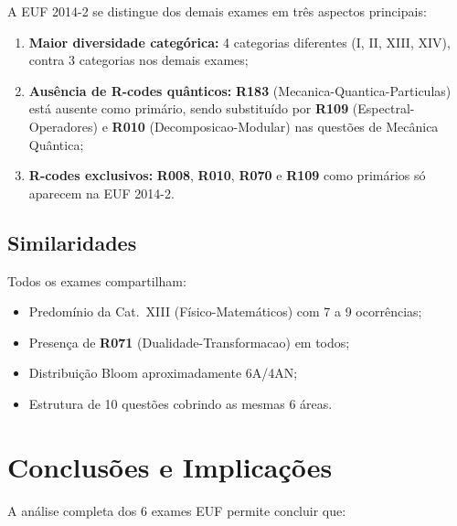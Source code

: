 \documentclass[12pt,a4paper]{article}
\newcommand{\rcode}[1]{\textcolor{azulprof}{\textbf{#1}}}
\begin{document}
A EUF 2014-2 se distingue dos demais exames em três aspectos principais:

\begin{enumerate}
  \item \textbf{Maior diversidade categórica:} 4 categorias diferentes
    (I, II, XIII, XIV), contra 3 categorias nos demais exames;
  \item \textbf{Ausência de R-codes quânticos:} \rcode{R183}
    (Mecanica-Quantica-Particulas) está ausente como primário, sendo
    substituído por \rcode{R109} (Espectral-Operadores) e \rcode{R010}
    (Decomposicao-Modular) nas questões de Mecânica Quântica;
  \item \textbf{R-codes exclusivos:} \rcode{R008}, \rcode{R010},
    \rcode{R070} e \rcode{R109} como primários só aparecem na EUF 2014-2.
\end{enumerate}

\subsection{Similaridades}

Todos os exames compartilham:
\begin{itemize}
  \item Predomínio da Cat.~XIII (Físico-Matemáticos) com 7 a 9 ocorrências;
  \item Presença de \rcode{R071} (Dualidade-Transformacao) em todos;
  \item Distribuição Bloom aproximadamente 6A/4AN;
  \item Estrutura de 10 questões cobrindo as mesmas 6 áreas.
\end{itemize}

\section{Conclusões e Implicações}

A análise completa dos 6 exames EUF permite concluir que:
\end{document}

